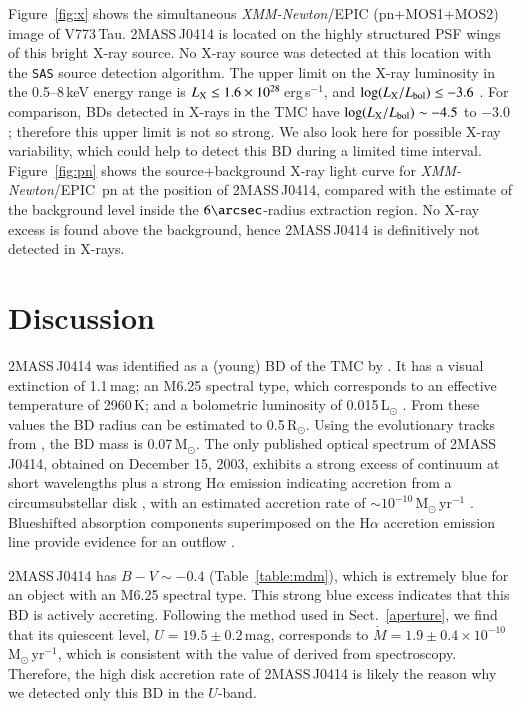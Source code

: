 \documentclass{aa}
\newcommand{\xmm}{{\it XMM-Newton}}
\begin{document}
Figure~\ref{fig:x} shows the simultaneous \xmm/EPIC (pn+MOS1+MOS2) image of
V773\,Tau. 2MASS\,J0414 is located on the highly structured PSF wings
of this bright X-ray source. No X-ray source was detected at this
location with the {\tt SAS} source detection algorithm. The upper
limit on the X-ray luminosity in the 0.5--8\,keV energy range is
$L_{\rm X} \le 1.6\times10^{28}$\,erg\,s$^{-1}$, and
$\log(L_{\rm X}/L_{\rm bol}) \le -3.6$ \citep{grosso06}. For
comparison, BDs detected in X-rays in the TMC have
$\log(L_{\rm X}/L_{\rm bol}) \sim -4.5$ to $-3.0$
\citep{neuhaeuser99,mokler02,grosso06};
therefore this upper limit is not so strong. We also look here for
possible X-ray variability, which could help to detect this BD during
a limited time interval. Figure~\ref{fig:pn} shows the source+background
X-ray light curve for \xmm/EPIC~pn at the position of 2MASS\,J0414,
compared with the estimate of the background level inside the
$6\arcsec$-radius extraction region. No X-ray excess is found above
the background, hence 2MASS\,J0414 is definitively not detected in
X-rays.

\section{Discussion}
\label{discussion}

2MASS\,J0414 was identified as a (young) BD of the TMC by
\citet{luhman04}. It has a visual extinction of 1.1\,mag; an
M6.25 spectral type, which corresponds to an effective
temperature of 2960\,K; and a bolometric
luminosity of 0.015\,L$_\odot$ \citep{luhman04}. From these values the
BD radius can be estimated to 0.5\,R$_\odot$. Using the evolutionary
tracks from \citet{baraffe98},  the BD mass is 0.07\,M$_\odot$. The
only published optical spectrum of 2MASS\,J0414,
obtained on December 15, 2003, exhibits a strong excess of continuum at
short wavelengths plus a strong H$\alpha$ emission \citep[$EW({\rm
H}\alpha)$=250\,\AA;][]{muzerolle05b} indicating accretion from a
circumsubstellar disk \citep{luhman04}, with an estimated accretion
rate of $\sim$$10^{-10}$\,M$_\odot$\,yr$^{-1}$
\citep{muzerolle05b}. Blueshifted absorption components superimposed
on the H$\alpha$ accretion emission line provide evidence for an
outflow \citep{muzerolle05b}.

2MASS\,J0414 has $B-V \sim -0.4$ (Table~\ref{table:mdm}), which
is extremely blue for an object with an M6.25
spectral type. This strong blue excess indicates that this BD is
actively accreting. Following the method used in Sect.~\ref{aperture},
we find that its quiescent level, $U=19.5\pm0.2$\,mag, corresponds to
$\dot{M}=1.9\pm0.4 \times 10^{-10}$\,M$_\odot$\,yr$^{-1}$, which is
consistent with the value of \citet{muzerolle05b} derived from
spectroscopy. Therefore, the high disk accretion rate of 2MASS\,J0414
is likely the reason why we detected only this BD in the $U$-band.
\end{document}
